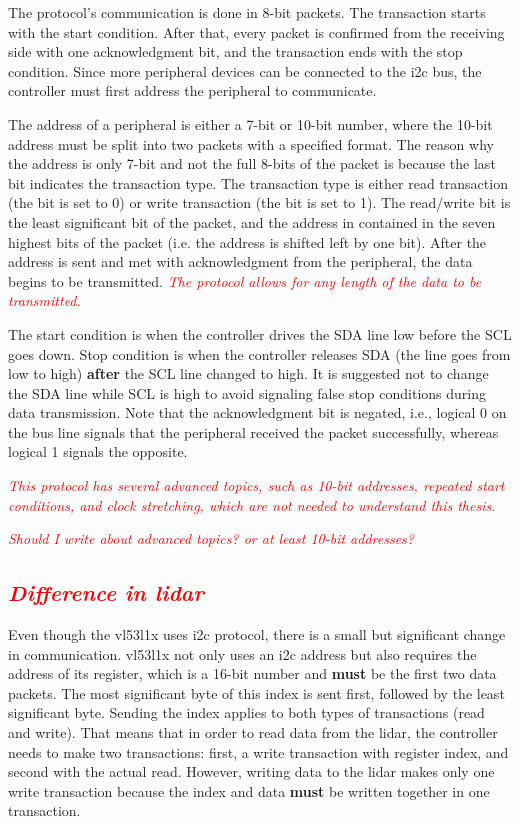 \documentclass[
  digital,     %
  oneside,     %
  nosansbold,  %
  nocolorbold, %
  lof,         %
  lot,         %
]{fithesis4}
\newcommand{\TODO}[1]{\textcolor{red}{\textit{#1}}}
\begin{document}
{{{The protocol's communication is done in 8-bit packets. The transaction starts with the start condition. After that, every packet is confirmed from the receiving side with one acknowledgment bit, and the transaction ends with the stop condition. Since more peripheral devices can be connected to the \acrshort{i2c} bus, the controller must first address the peripheral to communicate.

The address of a peripheral is either a 7-bit or 10-bit number, where the 10-bit address must be split into two packets with a specified format. The reason why the address is only 7-bit and not the full 8-bits of the packet is because the last bit indicates the transaction type. The transaction type is either read transaction (the bit is set to 0) or write transaction (the bit is set to 1). The read/write bit is the least significant bit of the packet, and the address in contained in the seven highest bits of the packet (i.e. the address is shifted left by one bit). After the address is sent and met with acknowledgment from the peripheral, the data begins to be transmitted. \TODO{The protocol allows for any length of the data to be transmitted.}

The start condition is when the controller drives the SDA line low before the SCL goes down. Stop condition is when the controller releases SDA (the line goes from low to high) \textbf{after} the SCL line changed to high. It is suggested not to change the SDA line while SCL is high to avoid signaling false stop conditions during data transmission. Note that the acknowledgment bit is negated, i.e., logical 0 on the bus line signals that the peripheral received the packet successfully, whereas logical 1 signals the opposite.

\TODO{This protocol has several advanced topics, such as 10-bit addresses, repeated start conditions, and clock stretching, which are not needed to understand this thesis.}

\TODO{Should I write about advanced topics? or at least 10-bit addresses?}

\subsection{ \TODO{Difference in lidar} } \label{sec:lidar-i2c}
Even though the \gls{vl53l1x} uses \acrshort{i2c} protocol, there is a small but significant change in communication. \gls{vl53l1x} not only uses an \acrshort{i2c} address but also requires the address of its register, which is a 16-bit number and \textbf{must} be the first two data packets. The most significant byte of this index is sent first, followed by the least significant byte. Sending the index applies to both types of transactions (read and write). That means that in order to read data from the \acrshort{lidar}, the controller needs to make two transactions: first, a write transaction with register index, and second with the actual read. However, writing data to the \acrshort{lidar} makes only one write transaction because the index and data \textbf{must} be written together in one transaction.

}}}
\end{document}
